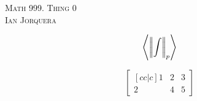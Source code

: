 \documentclass[12pt]{amsart}
\begin{document}
\begin{center}
    \textsc{Math 999. Thing 0\\ Ian Jorquera}
\end{center}
\vspace{1em}

$$\ip{\norm{\int}_p}$$


$$\begin{bmatrix}[cc|c]
1 & 2 & 3\\
2 & 4 & 5\end{bmatrix}$$
\end{document}
